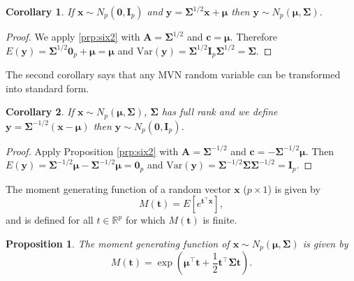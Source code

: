 \documentclass[]{book}
\newtheorem{corollary}{Corollary}[chapter]
\newtheorem{proposition}{Proposition}[chapter]
\theoremstyle{definition}
\theoremstyle{definition}
\theoremstyle{definition}
\theoremstyle{remark}
\begin{document}
\begin{corollary}
\protect\hypertarget{cor:csix2}{}{\label{cor:csix2} } If \(\boldsymbol x\sim N_p(\boldsymbol 0,\boldsymbol I_p)\) and \(\boldsymbol y= \boldsymbol \Sigma^{1/2} \boldsymbol x+ \boldsymbol \mu\) then \(\boldsymbol y\sim N_p(\boldsymbol \mu,\boldsymbol \Sigma)\).
\end{corollary}

\begin{proof}
{}We apply \ref{prp:six2} with \(\boldsymbol A= \boldsymbol \Sigma^{1/2}\) and \(\boldsymbol c= \boldsymbol \mu\). Therefore \(E(\boldsymbol y) = \boldsymbol \Sigma^{1/2} \boldsymbol 0_p + \boldsymbol \mu= \boldsymbol \mu\) and \(\text{Var}(\boldsymbol y) = \boldsymbol \Sigma^{1/2} \boldsymbol I_p \boldsymbol \Sigma^{1/2} = \boldsymbol \Sigma\).
\end{proof}

The second corollary says that any MVN random variable can be transformed into standard form.

\begin{corollary}
\protect\hypertarget{cor:csix3}{}{\label{cor:csix3} }If \(\boldsymbol x\sim N_p(\boldsymbol \mu,\boldsymbol \Sigma)\), \(\boldsymbol \Sigma\) has full rank and we define \(\boldsymbol y= \boldsymbol \Sigma^{-1/2}(\boldsymbol x- \boldsymbol \mu)\) then \(\boldsymbol y\sim N_p(\boldsymbol 0,\boldsymbol I_p)\).
\end{corollary}

\begin{proof}
{}Apply Proposition \ref{prp:six2} with \(\boldsymbol A= \boldsymbol \Sigma^{-1/2}\) and \(\boldsymbol c= - \boldsymbol \Sigma^{-1/2} \boldsymbol \mu\). Then \(E(\boldsymbol y) = \boldsymbol \Sigma^{-1/2} \boldsymbol \mu- \boldsymbol \Sigma^{-1/2} \boldsymbol \mu= \boldsymbol 0_p\) and \(\text{Var}(\boldsymbol y) = \boldsymbol \Sigma^{-1/2} \boldsymbol \Sigma\boldsymbol \Sigma^{-1/2} = \boldsymbol I_p\).
\end{proof}

The moment generating function of a random vector \(\boldsymbol x\) (\(p \times 1\)) is given by
\[
M({\mathbf t})=E[e^{{\mathbf t}^\top \boldsymbol x}],
\]
and is defined for all \(t \in \mathbb{R}^p\) for which \(M({\mathbf t})\) is finite.

\begin{proposition}
\protect\hypertarget{prp:six3}{}{\label{prp:six3} } The moment generating function of \(\boldsymbol x\sim N_p(\boldsymbol \mu, \boldsymbol \Sigma)\) is given by
\begin{equation}
M({\mathbf t})=\exp \left (\boldsymbol \mu^\top  {\mathbf t} + \frac{1}{2} {\mathbf t}^\top \boldsymbol \Sigma{\mathbf t} \right).
\label{eq:Mt}
\end{equation}
\end{proposition}
\end{document}
